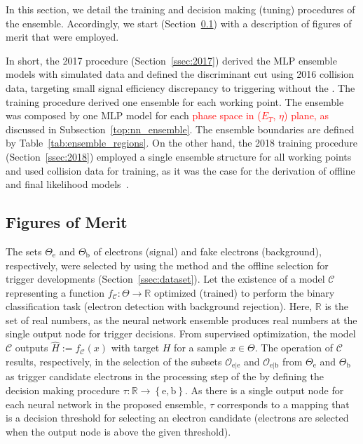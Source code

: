 In this section, we detail the training and decision making (tuning) procedures
of the \rnn ensemble. Accordingly, we start (Section~\ref{ssec:fom}) with a
description of figures of merit that were employed.

In short, the 2017 procedure (Section~\ref{ssec:2017}) derived the MLP ensemble
models with simulated data and defined the discriminant cut using
2016 collision data, targeting small signal efficiency discrepancy to triggering 
without the \rnn{}. The training procedure derived one ensemble for each working
point. The ensemble was composed by one MLP model for each \textcolor{red}{phase space in ($E_T$, $\eta$) plane, as} discussed 
in Subsection~\ref{top:nn_ensemble}. The ensemble boundaries are defined by Table~\ref{tab:ensemble_regions}. On the other hand, the 2018 training procedure (Section~\ref{ssec:2018})
employed a single ensemble structure for all working points and used
collision data for training, as it was the case for the derivation of offline
and final \hlt likelihood models~\cite{aaboud2019electron}.



\subsection{Figures of Merit}\label{ssec:fom}



The sets $\Theta_{\text{e}}$ and $\Theta_{\text{b}}$ of electrons (signal) and fake electrons (background), respectively, were selected by using the \tnp{} method and the offline selection for trigger developments (Section~\ref{ssec:dataset}). Let the existence of a model $\mathcal{C}$ representing a function $f_{\mathcal{C}} : \Theta \rightarrow \mathbb{R}$ optimized (trained) to perform the binary classification task (electron detection with background rejection). Here, $\mathbb{R}$ is the set of real numbers, as the neural network ensemble produces real numbers at the single output node for trigger decisions.  From supervised optimization, the model $\mathcal{C}$ outputs $\hat{H}:=f_{\mathcal{C}}(x)$ with target $H$ for a sample $x \in \Theta$. The operation of $\mathcal{C}$ results, respectively, in the selection of the subsets $\mathcal{O}_{\text{e}|\text{e}}$ and $\mathcal{O}_{\text{e}|\text{b}}$ from $\Theta_{\text{e}}$ and $\Theta_{\text{b}}$ as trigger candidate electrons in the \fastcalo{} processing step of the \hlt{} by defining the decision making procedure $\tau : \mathbb{R} \rightarrow \left\{\text{e},\text{b}\right\}$. As there is a single output node for each neural network in the proposed \rnn{} ensemble, $\tau$ corresponds to a mapping that is a decision threshold for selecting an electron candidate (electrons are selected when the output node is above the given threshold).  


